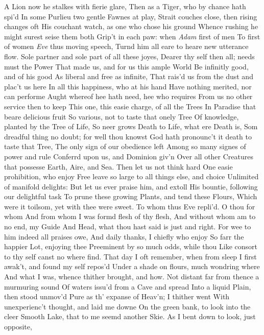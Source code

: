 \documentclass[11pt]{book}
\newcounter {first}
\begin{document}
A Lion now he stalkes with fierie glare, 
Then as a Tiger, who by chance hath spi'd 
In some Purlieu two gentle Fawnes at play, 
Strait couches close, then rising changes oft 
His couchant watch, as one who chose his ground 
Whence rushing he might surest seise them both 
Grip't in each paw: when \textit{Adam} first of men 
To first of women \textit{Eve} thus moving speech, 
Turnd him all eare to heare new utterance flow. 
\quad Sole partner and sole part of all these joyes, 
Dearer thy self then all; needs must the Power 
That made us, and for us this ample World 
Be infinitly good, and of his good 
As liberal and free as infinite, 
That rais'd us from the dust and plac't us here 
In all this happiness, who at his hand 
Have nothing merited, nor can performe 
Aught whereof hee hath need, hee who requires 
From us no other service then to keep 
This one, this easie charge, of all the Trees 
In Paradise that beare delicious fruit 
So various, not to taste that onely Tree 
Of knowledge, planted by the Tree of Life, 
So neer grows Death to Life, what ere Death is, 
Som dreadful thing no doubt; for well thou knowst 
God hath pronounc't it death to taste that Tree, 
The only sign of our obedience left 
Among so many signes of power and rule 
Conferrd upon us, and Dominion giv'n 
Over all other Creatures that possesse 
Earth, Aire, and Sea.  Then let us not think hard 
One easie prohibition, who enjoy 
Free leave so large to all things else, and choice 
Unlimited of manifold delights: 
But let us ever praise him, and extoll 
His bountie, following our delightful task 
To prune these growing Plants, and tend these Flours, 
Which were it toilsom, yet with thee were sweet. 
\quad To whom thus Eve repli'd.  O thou for whom 
And from whom I was formd flesh of thy flesh, 
And without whom am to no end, my Guide 
And Head, what thou hast said is just and right. 
For wee to him indeed all praises owe, 
And daily thanks, I chiefly who enjoy 
So farr the happier Lot, enjoying thee 
Preeminent by so much odds, while thou 
Like consort to thy self canst no where find. 
That day I oft remember, when from sleep 
I first awak't, and found my self repos'd 
Under a shade on flours, much wondring where 
And what I was, whence thither brought, and how. 
Not distant far from thence a murmuring sound 
Of waters issu'd from a Cave and spread 
Into a liquid Plain, then stood unmov'd 
Pure as th' expanse of Heav'n; I thither went 
With unexperienc't thought, and laid me downe 
On the green bank, to look into the cleer 
Smooth Lake, that to me seemd another Skie. 
As I bent down to look, just opposite, 
\end{document}
